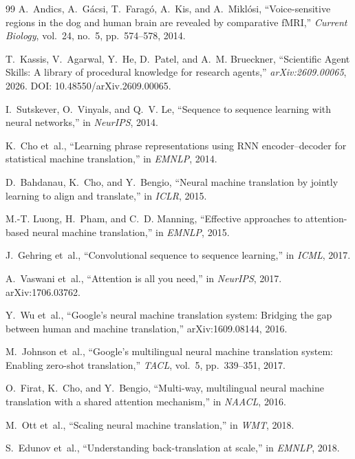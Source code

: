 \begin{thebibliography}{99}
A.~Andics, A.~G\'acsi, T.~Farag\'o, A.~Kis, and A.~Mikl\'osi,
``Voice-sensitive regions in the dog and human brain are revealed by
comparative fMRI,'' \emph{Current Biology}, vol.~24, no.~5, pp.~574--578, 2014.

T.~Kassis, V.~Agarwal, Y.~He, D.~Patel, and A.~M. Brueckner,
``Scientific Agent Skills: A library of procedural knowledge for research
agents,'' \emph{arXiv:2609.00065}, 2026.
DOI: 10.48550/arXiv.2609.00065.

I.~Sutskever, O.~Vinyals, and Q.~V. Le, ``Sequence to sequence learning with
neural networks,'' in \emph{NeurIPS}, 2014.

K.~Cho et~al., ``Learning phrase representations using RNN encoder--decoder for
statistical machine translation,'' in \emph{EMNLP}, 2014.

D.~Bahdanau, K.~Cho, and Y.~Bengio, ``Neural machine translation by jointly
learning to align and translate,'' in \emph{ICLR}, 2015.

M.-T. Luong, H.~Pham, and C.~D. Manning, ``Effective approaches to
attention-based neural machine translation,'' in \emph{EMNLP}, 2015.

J.~Gehring et~al., ``Convolutional sequence to sequence learning,'' in
\emph{ICML}, 2017.

A.~Vaswani et~al., ``Attention is all you need,'' in \emph{NeurIPS}, 2017.
arXiv:1706.03762.

Y.~Wu et~al., ``Google's neural machine translation system: Bridging the gap
between human and machine translation,'' arXiv:1609.08144, 2016.

M.~Johnson et~al., ``Google's multilingual neural machine translation system:
Enabling zero-shot translation,'' \emph{TACL}, vol.~5, pp.~339--351, 2017.

O.~Firat, K.~Cho, and Y.~Bengio, ``Multi-way, multilingual neural machine
translation with a shared attention mechanism,'' in \emph{NAACL}, 2016.

M.~Ott et~al., ``Scaling neural machine translation,'' in \emph{WMT}, 2018.

S.~Edunov et~al., ``Understanding back-translation at scale,'' in \emph{EMNLP},
2018.


\end{thebibliography}
